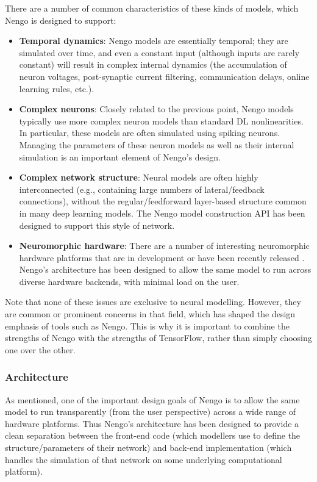 \documentclass{article}
\begin{document}
There are a number of common characteristics of these kinds of models, which Nengo is designed to support:

\begin{itemize}
\item {\bf Temporal dynamics}: Nengo models are essentially temporal; they are simulated over time, and even a constant input (although inputs are rarely constant) will result in complex internal dynamics (the accumulation of neuron voltages, post-synaptic current filtering, communication delays, online learning rules, etc.).
\item {\bf Complex neurons}: Closely related to the previous point, Nengo models typically use more complex neuron models than standard DL nonlinearities. In particular, these models are often simulated using spiking neurons.  Managing the parameters of these neuron models as well as their internal simulation is an important element of Nengo's design.
\item {\bf Complex network structure}: Neural models are often highly interconnected (e.g., containing large numbers of lateral/feedback connections), without the regular/feedforward layer-based structure common in many deep learning models.  The Nengo model construction API has been designed to support this style of network.
\item {\bf Neuromorphic hardware}: There are a number of interesting neuromorphic hardware platforms that are in development or have been recently released \citep{Khan2008,Benjamin2014,Davies2018}.  Nengo's architecture has been designed to allow the same model to run across diverse hardware backends, with minimal load on the user.
\end{itemize}

Note that none of these issues are exclusive to neural modelling.  However, they are common or prominent concerns in that field, which has shaped the design emphasis of tools such as Nengo.  This is why it is important to combine the strengths of Nengo with the strengths of TensorFlow, rather than simply choosing one over the other.

\subsubsection{Architecture}

As mentioned, one of the important design goals of Nengo is to allow the same model to run transparently (from the user perspective) across a wide range of hardware platforms.  Thus Nengo's architecture has been designed to provide a clean separation between the front-end code (which modellers use to define the structure/parameters of their network) and back-end implementation (which handles the simulation of that network on some underlying computational platform).  
\end{document}

